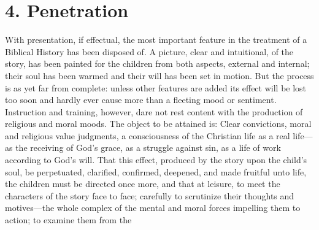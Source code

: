 \section{4. Penetration}

With presentation, if effectual, the most important feature in the treatment of a Biblical History has been disposed of. A picture, clear and intuitional, of the story, has been painted for the children from both aspects, external and internal; their soul has been warmed and their will has been set in motion. But the process is as yet far from complete: unless other features are added its effect will be lost too soon and hardly ever cause more than a fleeting mood or sentiment. Instruction and training, however, dare not rest content with the production of religious and moral moods. The object to be attained is: Clear convictions, moral and religious value judgments, a consciousness of the Christian life as a real life—as the receiving of God's grace, as a struggle against sin, as a life of work according to God's will. That this effect, produced by the story upon the child's soul, be perpetuated, clarified, confirmed, deepened, and made fruitful unto life, the children must be directed once more, and that at leisure, to meet the characters of the story face to face; carefully to scrutinize their thoughts and motives—the whole complex of the mental and moral forces impelling them to action; to examine them from the

